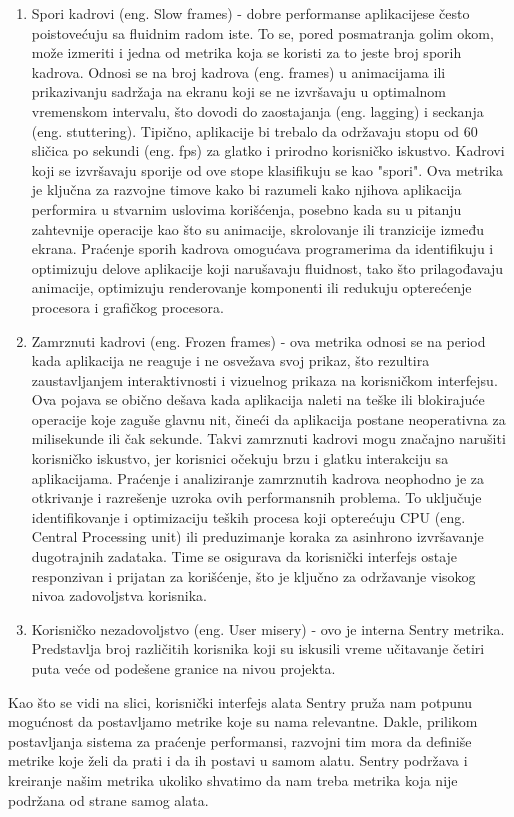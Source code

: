 \documentclass[12pt,oneside]{memoir}
\begin{document}
\begin{enumerate}
    \item Spori kadrovi (eng. Slow frames) - dobre performanse aplikacijese često poistovećuju sa fluidnim radom iste. To se, pored posmatranja golim okom, može izmeriti i jedna od metrika koja se koristi za to jeste broj sporih kadrova. Odnosi se na broj kadrova (eng. frames) u animacijama ili prikazivanju sadržaja na ekranu koji se ne izvršavaju u optimalnom vremenskom intervalu, što dovodi do zaostajanja (eng. lagging) i seckanja (eng. stuttering). Tipično, aplikacije bi trebalo da održavaju stopu od 60 sličica po sekundi (eng. fps) za glatko i prirodno korisničko iskustvo. Kadrovi koji se izvršavaju sporije od ove stope klasifikuju se kao "spori". Ova metrika je ključna za razvojne timove kako bi razumeli kako njihova aplikacija performira u stvarnim uslovima korišćenja, posebno kada su u pitanju zahtevnije operacije kao što su animacije, skrolovanje ili tranzicije između ekrana. Praćenje sporih kadrova omogućava programerima da identifikuju i optimizuju delove aplikacije koji narušavaju fluidnost, tako što prilagođavaju animacije, optimizuju renderovanje komponenti ili redukuju opterećenje procesora i grafičkog procesora.
    \item Zamrznuti kadrovi (eng. Frozen frames) - ova metrika odnosi se na period kada aplikacija ne reaguje i ne osvežava svoj prikaz, što rezultira zaustavljanjem interaktivnosti i vizuelnog prikaza na korisničkom interfejsu. Ova pojava se obično dešava kada aplikacija naleti na teške ili blokirajuće operacije koje zaguše glavnu nit, čineći da aplikacija postane neoperativna za milisekunde ili čak sekunde. Takvi zamrznuti kadrovi mogu značajno narušiti korisničko iskustvo, jer korisnici očekuju brzu i glatku interakciju sa aplikacijama. Praćenje i analiziranje zamrznutih kadrova neophodno je za otkrivanje i razrešenje uzroka ovih performansnih problema. To uključuje identifikovanje i optimizaciju teških procesa koji opterećuju CPU (eng. Central Processing unit) ili preduzimanje koraka za asinhrono izvršavanje dugotrajnih zadataka. Time se osigurava da korisnički interfejs ostaje responzivan i prijatan za korišćenje, što je ključno za održavanje visokog nivoa zadovoljstva korisnika.
    \item Korisničko nezadovoljstvo (eng. User misery) - ovo je interna Sentry metrika. Predstavlja broj različitih korisnika koji su iskusili vreme učitavanje četiri puta veće od podešene granice na nivou projekta. 
\end{enumerate}

Kao što se vidi na slici, korisnički interfejs alata Sentry pruža nam potpunu mogućnost da postavljamo metrike koje su nama relevantne. Dakle, prilikom postavljanja sistema za praćenje performansi, razvojni tim mora da definiše metrike koje želi da prati i da ih postavi u samom alatu. Sentry podržava i kreiranje našim metrika ukoliko shvatimo da nam treba metrika koja nije podržana od strane samog alata. 
\end{document}

